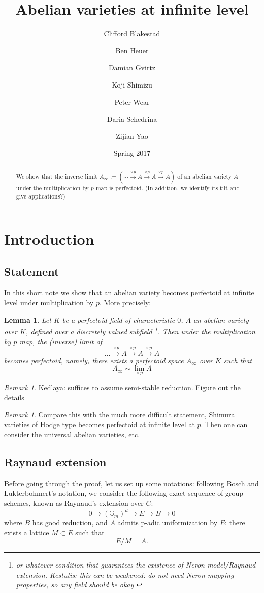 \documentclass[11pt,oneside]{amsart}
\title[Abelian varieties at infinite level]{Abelian varieties at infinite level}
\date{Spring 2017}
\author{
Clifford Blakestad \and
Ben Heuer \and 
Damian Gvirtz \and
Koji Shimizu \and 
Peter Wear \and
Daria Schedrina \and
Zijian Yao}
\theoremstyle{theorem}
\newtheorem{lemma}[theorem]{Lemma}
\theoremstyle{definition}
\theoremstyle{remark}
\newtheorem{remark}[theorem]{Remark}
\begin{document}
	
\maketitle

\begin{abstract}
We show that the inverse limit  $A_\infty := ( \cdots \xrightarrow{\times p } A \xrightarrow{\times p } A \xrightarrow{\times p } A )$ of an abelian variety $A$ under the multiplication by $p$ map is perfectoid. (In addition, we identify its tilt and give applications?)
\end{abstract}

\section{Introduction}
	
\subsection{Statement}
In this short note we show that an abelian variety becomes perfectoid at infinite level under multiplication by $p$. More precisely:
\begin{lemma} \label{main_lemma}
Let $K$ be a perfectoid field of characteristic $0$, $A$ an abelian variety over $K$, defined over a discretely valued subfield \footnote{or whatever condition that guarantees the existence of Neron model/Raynaud extension. { \color{red} Kestutis: this can be weakened: do not need Neron mapping properties, so any field should be okay } }. Then  under the multiplication by $p$ map, the (inverse) limit of 
$$ ... \xrightarrow{\times p} A \xrightarrow{\times p} A \xrightarrow{\times p} A   $$
becomes perfectoid, namely, there exists a perfectoid space $A_\infty$ over $K$ such that 
$$A_\infty \sim \lim_{\times p} A$$
\end{lemma}


\begin{remark}
{\color{red} Kedlaya: suffices to assume semi-stable reduction. Figure out the details } 
\end{remark}

\begin{remark}
 Compare this with the much more difficult statement, Shimura varieties of Hodge type becomes perfectoid at infinite level at $p$. Then one can consider the universal abelian varieties, etc. 
\end{remark}

\subsection{Raynaud extension}
Before going through the proof, let us set up some notations: following Bosch and Lukterbohmert's notation, we consider the following exact sequence of group schemes, known as Raynaud's extension over $C$: 
$$ 0 \rightarrow (\mathbb G_m)^d \rightarrow E \rightarrow B \rightarrow 0 $$  where $B$ has good reduction, and $A$ admits p-adic uniformization by $E$: there exists a lattice $M \subset E$ such that 
$$ E/M = A.$$
\end{document}
